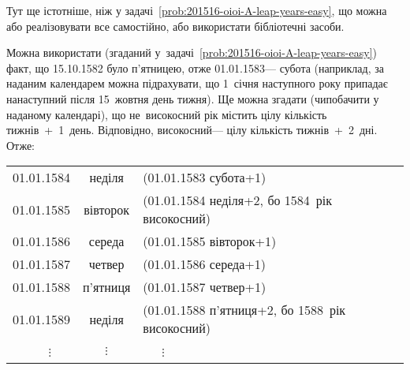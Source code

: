 \Tutorial	
Тут ще істотніше, ніж у задачі~\ref{prob:201516-oioi-A-leap-years-easy}, що можна або реалізовувати все самостійно, або використати бібліотечні засоби.

 Можна використати (згаданий у~задачі~\ref{prob:201516-oioi-A-leap-years-easy}) факт, що 15.10.1582 було п'ятницею, отже 01.01.1583\nolinebreak[3] --- субота (наприклад, за наданим %
 календарем можна підрахувати, що 1~січня наступного року припадає на\nolinebreak[2] наступний після 15~жовтня день тижня).
%
Ще можна згадати (чи\nolinebreak[3] побачити у 
нада\-ному
календарі), що не~високосний рік містить цілу кількість тижнів~+~1~день. Відповідно, високосний\nolinebreak[3] --- цілу кількість тижнів~+~2~дні. Отже:
\vspace{-0.5\baselineskip}
\begin{center}
\begin{tabular}{rcl}
01.01.1584 & неділя & (01.01.1583 субота+1) \\
01.01.1585 & вівторок & (01.01.1584 неділя+2, бо 1584~рік високосний) \\
01.01.1586 & середа & (01.01.1585 вівторок+1) \\
01.01.1587 & четвер & (01.01.1586 середа+1) \\
01.01.1588 & п'ятниця & (01.01.1587 четвер+1) \\
01.01.1589 & неділя & (01.01.1588 п'ятниця+2, бо 1588~рік високосний) \\
$\vdots$~~~ & $\vdots$ & ~~~$\vdots$
\end{tabular}
\end{center}
\vspace{-0.5\baselineskip}

